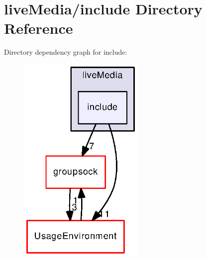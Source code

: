 \section{live\+Media/include Directory Reference}
\label{dir_4cba62d8ce5526ecc40a2e72b9201fb0}
Directory dependency graph for include\+:
\nopagebreak
\begin{figure}[H]
\begin{center}
\leavevmode
\includegraphics[width=171pt]{dir_4cba62d8ce5526ecc40a2e72b9201fb0_dep}
\end{center}
\end{figure}
